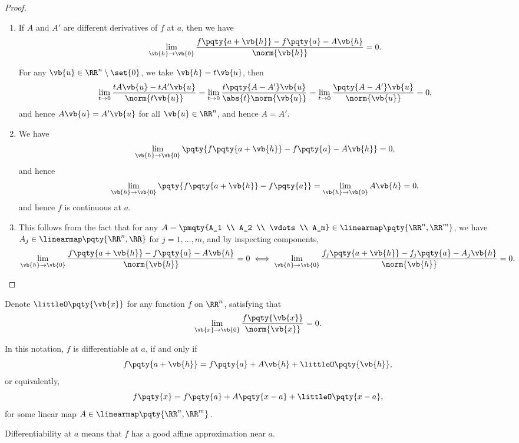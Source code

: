 \begin{proof}
    \begin{enumerate}[label=(\roman*)]
        \item If \(A\) and \(A'\) are different derivatives of \(f\) at \(a\), then we have
        \[
            \lim_{\vb{h} \to \vb{0}} \frac{f\pqty{a + \vb{h}} - f\pqty{a} - A\vb{h}}{\norm{\vb{h}}} = 0.
        \]

        For any \(\vb{u} \in \RR^n \setminus \set{0}\), we take \(\vb{h} = t\vb{u}\), then
        \[
            \lim_{t \to 0} \frac{t A \vb{u} - tA'\vb{u}}{\norm{t\vb{u}}} = \lim_{t \to 0} \frac{t \pqty{A - A'} \vb{u}}{\abs{t}\norm{\vb{u}}} = \lim_{t \to 0} \frac{\pqty{A - A'}\vb{u}}{\norm{\vb{u}}} = 0,
        \]
        and hence \(A\vb{u} = A'\vb{u}\) for all \(\vb{u} \in \RR^n\), and hence \(A = A'\).

        \item We have
        \[
            \lim_{\vb{h} \to \vb{0}} \pqty{f\pqty{a + \vb{h}} - f\pqty{a} - A\vb{h}} = 0,
        \]
        and hence
        \[
            \lim_{\vb{h} \to \vb{0}} \pqty{f\pqty{a + \vb{h}} - f\pqty{a}} = \lim_{\vb{h} \to \vb{0}} A\vb{h} = 0,
        \]
        and hence \(f\) is continuous at \(a\).

        \item This follows from the fact that for any \(A = \pmqty{A_1 \\ A_2 \\ \vdots \\ A_m} \in \linearmap\pqty{\RR^n, \RR^m}\), we have \(A_j \in \linearmap\pqty{\RR^n, \RR}\) for \(j = 1, \dots, m\), and by inspecting components,
        \[
            \lim_{\vb{h} \to \vb{0}} \frac{f\pqty{a + \vb{h}} - f\pqty{a} - A\vb{h}}{\norm{\vb{h}}} = 0 \iff \lim_{\vb{h} \to \vb{0}} \frac{f_j\pqty{a + \vb{h}} - f_j\pqty{a} - A_j\vb{h}}{\norm{\vb{h}}} = 0.
        \]
    \end{enumerate}
\end{proof}

\begin{notation}
    Denote \(\littleO\pqty{\vb{x}}\) for any function \(f\) on \(\RR^n\), satisfying that
    \[
        \lim_{\vb{x} \to \vb{0}} \frac{f\pqty{\vb{x}}}{\norm{\vb{x}}} = 0.
    \]

    In this notation, \(f\) is differentiable at \(a\), if and only if
    \[
        f\pqty{a + \vb{h}} = f\pqty{a} + A \vb{h} + \littleO\pqty{\vb{h}},
    \]
    or equivalently,
    \[
        f\pqty{x} = f\pqty{a} + A\pqty{x - a} + \littleO\pqty{x - a},
    \]
    for some linear map \(A \in \linearmap\pqty{\RR^n, \RR^m}\).

    Differentiability at \(a\) means that \(f\) has a good affine approximation near \(a\).
\end{notation}

